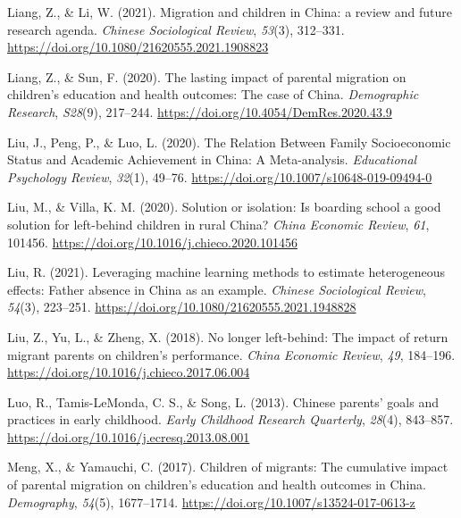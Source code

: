 \documentclass[
  man,floatsintext]{apa7}
\newlength{\cslhangindent}
\newlength{\cslentryspacingunit} %
\newenvironment{CSLReferences}[2] %
 {%
  \setlength{\parindent}{0pt}
  \ifodd #1
  \let\oldpar\par
  \def\par{\hangindent=\cslhangindent\oldpar}
  \fi
  \setlength{\parskip}{#2\cslentryspacingunit}
 }%
 {}
\begin{document}
\begin{CSLReferences}{1}{0}
\leavevmode{}%
Liang, Z., \& Li, W. (2021). Migration and children in {China}: a review and future research agenda. \emph{Chinese Sociological Review}, \emph{53}(3), 312--331. \url{https://doi.org/10.1080/21620555.2021.1908823}

\leavevmode{}%
Liang, Z., \& Sun, F. (2020). The lasting impact of parental migration on children's education and health outcomes: The case of {China}. \emph{Demographic Research}, \emph{S28}(9), 217--244. \url{https://doi.org/10.4054/DemRes.2020.43.9}

\leavevmode{}%
Liu, J., Peng, P., \& Luo, L. (2020). The Relation Between Family Socioeconomic Status and Academic Achievement in {China}: A Meta-analysis. \emph{Educational Psychology Review}, \emph{32}(1), 49--76. \url{https://doi.org/10.1007/s10648-019-09494-0}

\leavevmode{}%
Liu, M., \& Villa, K. M. (2020). Solution or isolation: Is boarding school a good solution for left-behind children in rural {China}? \emph{{China} Economic Review}, \emph{61}, 101456. \url{https://doi.org/10.1016/j.chieco.2020.101456}

\leavevmode{}%
Liu, R. (2021). Leveraging machine learning methods to estimate heterogeneous effects: Father absence in {China} as an example. \emph{Chinese Sociological Review}, \emph{54}(3), 223--251. \url{https://doi.org/10.1080/21620555.2021.1948828}

\leavevmode{}%
Liu, Z., Yu, L., \& Zheng, X. (2018). No longer left-behind: The impact of return migrant parents on children's performance. \emph{{China} Economic Review}, \emph{49}, 184--196. \url{https://doi.org/10.1016/j.chieco.2017.06.004}

\leavevmode{}%
Luo, R., Tamis-LeMonda, C. S., \& Song, L. (2013). Chinese parents{'} goals and practices in early childhood. \emph{Early Childhood Research Quarterly}, \emph{28}(4), 843--857. \url{https://doi.org/10.1016/j.ecresq.2013.08.001}

\leavevmode{}%
Meng, X., \& Yamauchi, C. (2017). Children of migrants: The cumulative impact of parental migration on children{'}s education and health outcomes in {China}. \emph{Demography}, \emph{54}(5), 1677--1714. \url{https://doi.org/10.1007/s13524-017-0613-z}


\end{CSLReferences}
\end{document}
